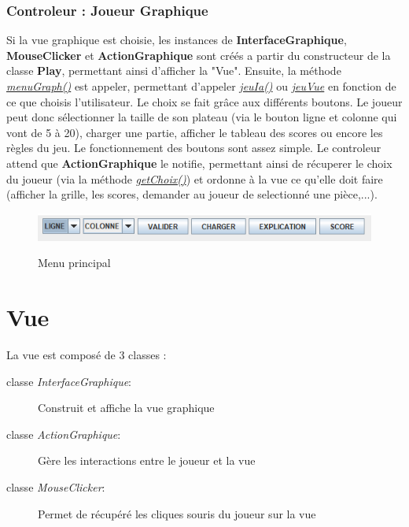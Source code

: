         \subsubsection{Controleur : Joueur Graphique}\label{subsub:graph}
        Si la vue graphique est choisie, les instances de \textbf{InterfaceGraphique}, \textbf{MouseClicker} et \textbf{ActionGraphique} sont créés a partir du constructeur de la classe \textbf{Play}, permettant ainsi d'afficher la "Vue". Ensuite, la méthode \underline{\textit{menuGraph()}} est appeler, permettant d'appeler \underline{\textit{jeuIa()}} ou \underline{\textit{jeuVue}} en fonction de ce que choisis l'utilisateur. Le choix se fait grâce aux différents boutons. Le joueur peut donc sélectionner la taille de son plateau (via le bouton ligne et colonne qui vont de 5 à 20), charger une partie, afficher le tableau des scores ou encore les règles du jeu. Le fonctionnement des boutons sont assez simple. Le controleur attend que \textbf{ActionGraphique} le notifie, permettant ainsi de récuperer le choix du joueur (via la méthode \underline{\textit{getChoix()}}) et ordonne à la vue ce qu'elle doit faire (afficher la grille, les scores, demander au joueur de selectionné une pièce,...).

        \begin{figure}[H]
            \centering
            \includegraphics[scale=0.8]{img/menu.png}\label{img:joueurGraphique}
            \caption{Menu principal}
        \end{figure}


    \section{Vue}
        La vue est composé de 3 classes :
        \begin{description}
            \item[classe \textit{InterfaceGraphique}:]{Construit et affiche la vue graphique }
            \item[classe \textit{ActionGraphique}:]{Gère les interactions entre le joueur et la vue}
            \item[classe \textit{MouseClicker}:]{Permet de récupéré les cliques souris du joueur sur la vue}
		\end{description}

